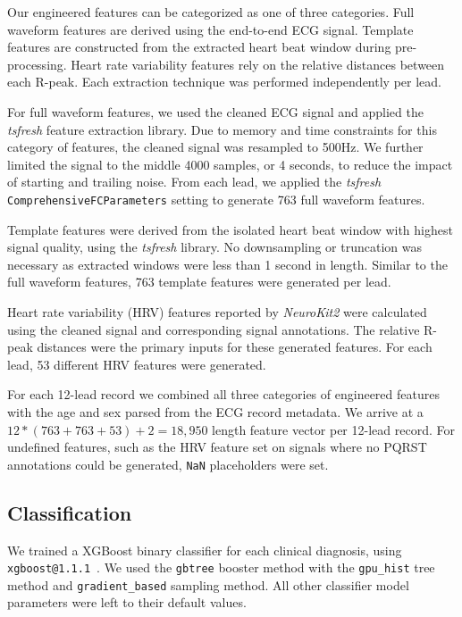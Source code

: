 \documentclass[twocolumn]{cinc}
\begin{document}
Our engineered features can be categorized as one of three categories.
Full waveform features are derived using the end-to-end ECG signal.
Template features are constructed from the extracted heart beat window during pre-processing.
Heart rate variability features rely on the relative distances between each R-peak.
Each extraction technique was performed independently per lead.

For full waveform features, we used the cleaned ECG signal and applied the \emph{tsfresh} feature extraction library.
Due to memory and time constraints for this category of features, the cleaned signal was resampled to 500Hz.
We further limited the signal to the middle 4000 samples, or 4 seconds, to reduce the impact of starting and trailing noise.
From each lead, we applied the \emph{tsfresh} \texttt{ComprehensiveFCParameters} setting to generate 763 full waveform features.

Template features were derived from the isolated heart beat window with highest signal quality, using the \emph{tsfresh} library.
No downsampling or truncation was necessary as extracted windows were less than 1 second in length.
Similar to the full waveform features, 763 template features were generated per lead.

Heart rate variability (HRV) features reported by \emph{NeuroKit2} were calculated using the cleaned signal and corresponding signal annotations.
The relative R-peak distances were the primary inputs for these generated features.
For each lead, 53 different HRV features were generated.

For each 12-lead record we combined all three categories of engineered features with the age and sex parsed from the ECG record metadata.
We arrive at a $12 * (763 + 763 + 53) + 2 = 18,950$ length feature vector per 12-lead record.
For undefined features, such as the HRV feature set on signals where no PQRST annotations could be generated, \texttt{NaN} placeholders were set.

\subsection{Classification}

We trained a XGBoost binary classifier for each clinical diagnosis, using \texttt{xgboost@1.1.1}~\cite{chen_xgboost_2016}.
We used the \texttt{gbtree} booster method with the \texttt{gpu\_hist} tree method and \texttt{gradient\_based} sampling method.
All other classifier model parameters were left to their default values.
\end{document}
